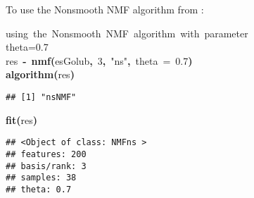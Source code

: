 \documentclass[a4paper]{article}\usepackage{graphicx, color}
\makeatletter
\newcommand{\hlnumber}[1]{\textcolor[rgb]{0,0,0}{#1}}%
\newcommand{\hlfunctioncall}[1]{\textcolor[rgb]{0.501960784313725,0,0.329411764705882}{\textbf{#1}}}%
\newcommand{\hlstring}[1]{\textcolor[rgb]{0.6,0.6,1}{#1}}%
\newcommand{\hlkeyword}[1]{\textcolor[rgb]{0,0,0}{\textbf{#1}}}%
\newcommand{\hlargument}[1]{\textcolor[rgb]{0.690196078431373,0.250980392156863,0.0196078431372549}{#1}}%
\newcommand{\hlcomment}[1]{\textcolor[rgb]{0.180392156862745,0.6,0.341176470588235}{#1}}%
\newcommand{\hlassignement}[1]{\textcolor[rgb]{0,0,0}{\textbf{#1}}}%
\newcommand{\hlsymbol}[1]{\textcolor[rgb]{0,0,0}{#1}}%
\newcommand{\hlstd}[1]{\textcolor[rgb]{0,0,0}{#1}}%
\newenvironment{kframe}{%
 \def\FrameCommand##1{\hskip\@totalleftmargin \hskip-\fboxsep
 \colorbox{shadecolor}{##1}\hskip-\fboxsep
     \hskip-\linewidth \hskip-\@totalleftmargin \hskip\columnwidth}%
 \MakeFramed {\advance\hsize-\width
   \@totalleftmargin\z@ \linewidth\hsize
   \@setminipage}}%
 {\par\unskip\endMakeFramed}
\newenvironment{knitrout}{}{} %
\makeatother
\begin{document}
To use the Nonsmooth NMF algorithm from \cite{Pascual-Montano2006}: 
\begin{knitrout}
\color{fgcolor}\begin{kframe}
\begin{flushleft}
\ttfamily\noindent
\hlcomment{\usebox{\hlnormalsizeboxhash}{\ }using{\ }the{\ }Nonsmooth{\ }NMF{\ }algorithm{\ }with{\ }parameter}\hspace*{\fill}\\
\hlstd{}\hlcomment{\usebox{\hlnormalsizeboxhash}{\ }theta=0.7}\hspace*{\fill}\\
\hlstd{}\hlsymbol{res}{\ }\hlassignement{\usebox{\hlnormalsizeboxlessthan}-}{\ }\hlfunctioncall{nmf}\hlkeyword{(}\hlsymbol{esGolub}\hlkeyword{,}{\ }\hlnumber{3}\hlkeyword{,}{\ }\hlstring{"{}ns"{}}\hlkeyword{,}{\ }\hlargument{theta}{\ }\hlargument{=}{\ }\hlnumber{0.7}\hlkeyword{)}\hspace*{\fill}\\
\hlstd{}\hlfunctioncall{algorithm}\hlkeyword{(}\hlsymbol{res}\hlkeyword{)}\mbox{}
\normalfont
\end{flushleft}
\begin{verbatim}
## [1] "nsNMF"
\end{verbatim}
\begin{flushleft}
\ttfamily\noindent
\hlfunctioncall{fit}\hlkeyword{(}\hlsymbol{res}\hlkeyword{)}\mbox{}
\normalfont
\end{flushleft}
\begin{verbatim}
## <Object of class: NMFns >
## features: 200 
## basis/rank: 3 
## samples: 38 
## theta: 0.7 
\end{verbatim}
\end{kframe}
\end{knitrout}
\end{document}
